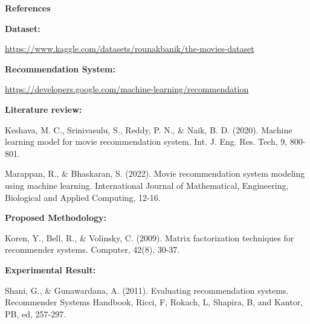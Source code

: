 \documentclass[11pt]{article}
\begin{document}
\begin{center}
    \textbf{\LARGE References}
\end{center}
\begin{flushleft}

\textbf{\large Dataset:}

\vspace{0.3cm}
\url{https://www.kaggle.com/datasets/rounakbanik/the-movies-dataset}

\vspace{0.3cm}
\textbf{\large Recommendation System:}

\vspace{0.3cm}
\url{https://developers.google.com/machine-learning/recommendation}

\vspace{0.3cm}
\textbf{\large Literature review:}

\vspace{0.3cm}
Keshava, M. C., Srinivasulu, S., Reddy, P. N., \& Naik, B. D. (2020). Machine learning model for movie recommendation system. Int. J. Eng. Res. Tech, 9, 800-801.

\vspace{0.3cm}

Marappan, R., \& Bhaskaran, S. (2022). Movie recommendation system modeling using machine learning. International Journal of Mathematical, Engineering, Biological and Applied Computing, 12-16.

\vspace{0.3cm}
\textbf{\large Proposed Methodology:}

\vspace{0.3cm}
Koren, Y., Bell, R., \& Volinsky, C. (2009). Matrix factorization techniques for recommender systems. Computer, 42(8), 30-37.

\vspace{0.3cm}
\textbf{\large Experimental Result:}

\vspace{0.3cm}
Shani, G., \& Gunawardana, A. (2011). Evaluating recommendation systems. Recommender Systems Handbook, Ricci, F, Rokach, L, Shapira, B, and Kantor, PB, ed, 257-297.

\end{flushleft}
    
\end{document}
